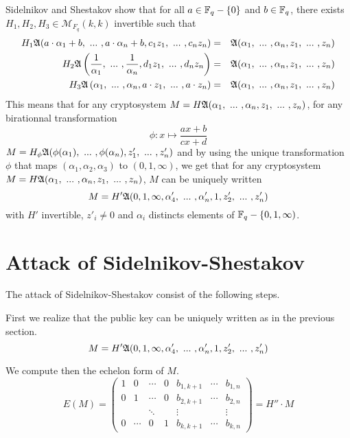 \documentclass[12pt,a4paper,titlepage]{article}
\begin{document}
Sidelnikov and Shestakov show \cite{SidelShes92} that for all $a \in \mathbb{F}_q-\{0\}$ and $b \in \mathbb{F}_q$, there exists $H_1, H_2, H_3 \in \mathcal{M}_{F_q}(k,k)$ invertible such that
\begin{eqnarray*}
H_1 \A(a\cdot\alpha_1 + b, \ ... \ , a\cdot \alpha_n + b, c_1z_1, \ ... \ , c_n z_n) &=& \A(\alpha_1, \ ... \ , \alpha_n, z_1, \ ... \ , z_n) \\
H_2 \A\left( \frac{1}{\alpha_1}, \ ... \ , \frac{1}{\alpha_n}, d_1z_1, \ ... \ , d_n z_n \right) &=& \A(\alpha_1, \ ... \ , \alpha_n, z_1, \ ... \ , z_n) \\
H_3 \A\left( \alpha_1, \ ... \ , \alpha_n, a\cdot z_1, \ ... \ , a\cdot z_n \right) &=& \A(\alpha_1, \ ... \ , \alpha_n, z_1, \ ... \ , z_n)
\end{eqnarray*}
This means that for any cryptosystem $M = H \A(\alpha_1, \ ... \ , \alpha_n, z_1, \ ... \ , z_n)$, for any birationnal transformation
$$ \phi : x \mapsto \frac{ax+b}{cx+d} $$
$M = H_{\phi} \frak{A}(\phi(\alpha_1), \ ... \ , \phi(\alpha_n), z'_1, \ ... \ , z'_n)$ and by using the unique transformation $\phi$ that maps $(\alpha_1, \alpha_2, \alpha_3)$ to $(0,1,\infty)$, we get that for any cryptosystem $M = H \A(\alpha_1, \ ... \ , \alpha_n, z_1, \ ... \ , z_n)$, $M$ can be uniquely written
$$ M = H' \frak{A}(0, 1, \infty, \alpha'_4, \ ... \ , \alpha'_n, 1, z'_2, \ ... \ , z'_n) $$
with $H'$ invertible, $z'_i \neq 0$ and $\alpha_i$ distincts elements of $\mathbb{F}_q-\{0, 1, \infty)$.

\section{Attack of Sidelnikov-Shestakov}

The attack of Sidelnikov-Shestakov consist of the following steps.

First we realize that the public key can be uniquely written as in the previous section.
$$ M = H' \frak{A}(0, 1, \infty, \alpha'_4, \ ... \ , \alpha'_n, 1, z'_2, \ ... \ , z'_n) $$

We compute then the echelon form of $M$.
$$ E(M) = 
\left(
\begin{array}{ccccccc}
1 & 0 & \cdots & 0 & b_{1,k+1} & \cdots & b_{1,n} \\
0 & 1 & \cdots & 0 & b_{2,k+1} & \cdots & b_{2,n} \\
  &   & \ddots &   & \vdots &   & \vdots \\
0 & \cdots & 0 & 1 & b_{k,k+1} & \cdots & b_{k,n}
\end{array}
\right) = H'' \cdot M
$$
\end{document}
